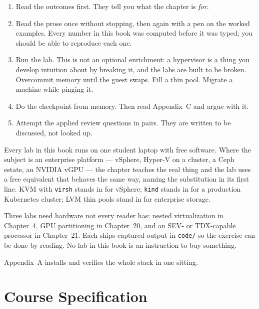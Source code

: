 \begin{enumerate}[leftmargin=2.2em, itemsep=3pt, topsep=4pt]
  \item Read the outcomes first. They tell you what the chapter is \emph{for}.
  \item Read the prose once without stopping, then again with a pen on the
        worked examples. Every number in this book was computed before it was
        typed; you should be able to reproduce each one.
  \item Run the lab. This is not an optional enrichment: a hypervisor is a thing
        you develop intuition about by breaking it, and the labs are built to be
        broken. Overcommit memory until the guest swaps. Fill a thin pool.
        Migrate a machine while pinging it.
  \item Do the checkpoint from memory. Then read Appendix~C and argue with it.
  \item Attempt the applied review questions in pairs. They are written to be
        discussed, not looked up.
\end{enumerate}

\begin{alertbox}
Every lab in this book runs on one student laptop with free software. Where the
subject is an enterprise platform --- vSphere, Hyper-V on a cluster, a Ceph
estate, an NVIDIA vGPU --- the chapter teaches the real thing and the lab uses a
free equivalent that behaves the same way, naming the substitution in its first
line. KVM with \texttt{virsh} stands in for vSphere; \texttt{kind} stands in for
a production Kubernetes cluster; LVM thin pools stand in for enterprise storage.

\smallskip
Three labs need hardware not every reader has: nested virtualization in
Chapter~4, GPU partitioning in Chapter~20, and an SEV- or TDX-capable processor
in Chapter~21. Each ships captured output in \texttt{code/} so the exercise can
be done by reading. No lab in this book is an instruction to buy something.

\smallskip
Appendix~A installs and verifies the whole stack in one sitting.
\end{alertbox}

\newpage

\chapter*{Course Specification}

